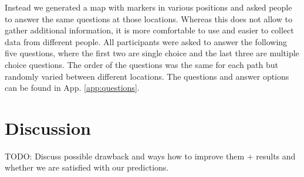 \documentclass[letterpaper]{article}
\begin{document}
Instead we generated a map with markers in various positions and asked people to answer the same questions at those locations. Whereas this does not allow to gather additional information, it is more comfortable to use and easier to collect data from different people. All participants were asked to answer the following five questions, where the first two are single choice and the last three are multiple choice questions. The order of the questions was the same for each path but randomly varied between different locations. The questions and answer options can be found in App. \ref{app:questions}.



\section{Discussion}\label{sec:discussion}
TODO: Discuss possible drawback and ways how to improve them + results and whether we are satisfied with our predictions.
\end{document}
